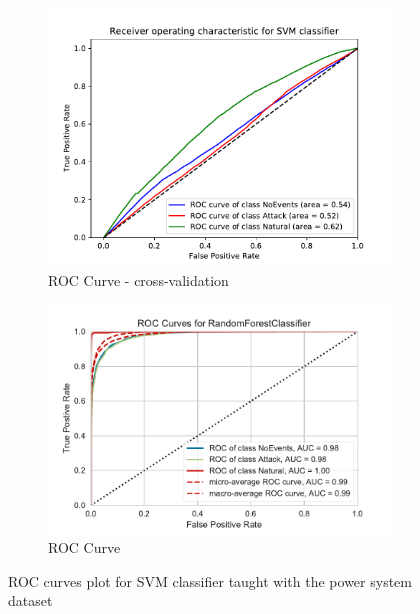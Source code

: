 \begin{figure}[t]
    \centering
    \begin{subfigure}[t]{110mm}
        \centering
        \includegraphics[page=1, width=\linewidth]{images/results_scikit/SVM}
        \caption{ROC Curve - cross-validation}
        \label{fig:scikit_SVM_ROC}
    \end{subfigure}
    \begin{subfigure}[t]{110mm}
        \centering
        \includegraphics[page=2, width=\linewidth]{images/roc_3c}
        \caption{ROC Curve}
        \label{fig:scikit_RF_ROC}
    \end{subfigure}
    \caption{ROC curves plot for SVM classifier taught with the power system dataset}
    \label{fig:ROCCM_SVM}
\end{figure}



